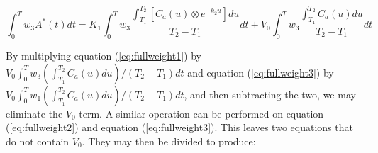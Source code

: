 \documentclass[12pt]{article}
\begin{document}
\begin{equation}
\int_{0}^{T} w_{3}A^{*}(t)dt = K_{1} \int_{0}^{T} w_{3}
\frac{\int_{T_1}^{T_2} \left[ C_{a}(u) \otimes e^{-k_{2}u} \right]
du}{T_2 - T_1} dt + V_{0} \int_{0}^{T}w_{3} \frac{\int_{T_1}^{T_2}
C_{a}(u) du}{T_2 - T_1} dt \label{eq:fullweight3}
\end{equation}

By multiplying equation (\ref{eq:fullweight1}) by $V_{0}
\int_{0}^{T} w_{3} {(\int_{T_1}^{T_2}C_{a}(u)du)}/{(T_2 - T_1)} dt$
and equation (\ref{eq:fullweight3}) by $V_{0} \int_{0}^{T} w_{1}
{(\int_{T_1}^{T_2}C_{a}(u)du)}/{(T_2 - T_1)} dt$, and then
subtracting the two, we may eliminate the $V_{0}$ term.  A similar
operation can be performed on equation (\ref{eq:fullweight2}) and
equation (\ref{eq:fullweight3}).  This leaves two equations that do
not contain $V_{0}$.  They may then be divided to produce:
\end{document}
